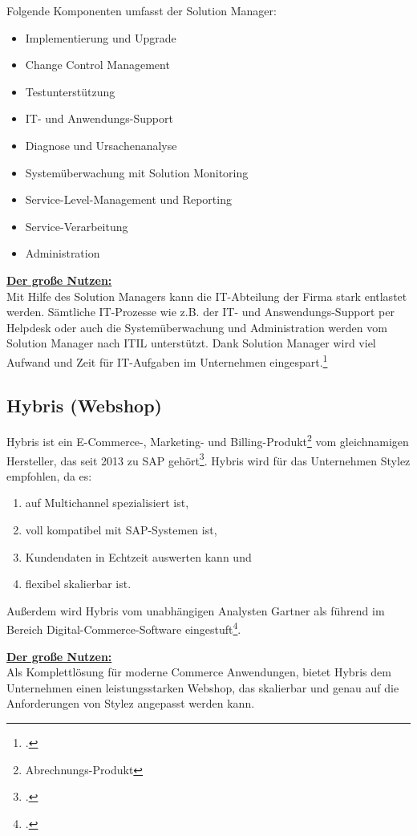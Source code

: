 Folgende Komponenten umfasst der Solution Manager:
\begin{itemize}
\item Implementierung und Upgrade
\item Change Control Management
\item Testunterstützung
\item IT- und Anwendungs-Support
\item Diagnose und Ursachenanalyse
\item Systemüberwachung mit Solution Monitoring
\item Service-Level-Management und Reporting
\item Service-Verarbeitung
\item Administration
\end{itemize}
\underline{\textbf{Der große Nutzen:}}\\
Mit Hilfe des Solution Managers kann die IT-Abteilung der Firma stark entlastet werden. Sämtliche IT-Prozesse wie z.B. der IT- und Answendungs-Support per Helpdesk oder auch die Systemüberwachung und Administration werden vom Solution Manager nach ITIL unterstützt. Dank Solution Manager wird viel Aufwand und Zeit für IT-Aufgaben im Unternehmen eingespart.\footcite[vgl.][Online im Internet.]{SolutionManager}

\subsection{Hybris (Webshop)}
Hybris ist ein E-Commerce-, Marketing- und Billing-Produkt\footnote{Abrechnungs-Produkt} vom gleichnamigen Hersteller, das seit 2013 zu SAP gehört\footcite[vgl.][Online im Internet.]{SAPHybris}. Hybris wird für das Unternehmen Stylez empfohlen, da es:
\begin{enumerate}
\item auf Multichannel spezialisiert ist,
\item voll kompatibel mit SAP-Systemen ist,
\item Kundendaten in Echtzeit auswerten kann und
\item flexibel skalierbar ist.
\end{enumerate}
Außerdem wird Hybris vom unabhängigen Analysten Gartner als führend im Bereich Digital-Commerce-Software eingestuft\footcite[Online im Internet.]{Gartner}.

\underline{\textbf{Der große Nutzen:}}\\
Als Komplettlösung für moderne Commerce Anwendungen, bietet Hybris dem Unternehmen einen leistungsstarken Webshop, das skalierbar und genau auf die Anforderungen von Stylez angepasst werden kann.

